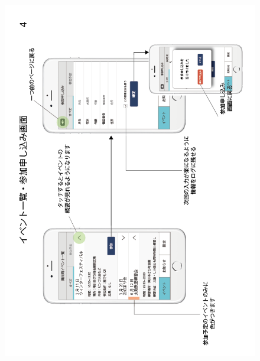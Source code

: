 \begin{figure}[ht]
    \begin{center}
    \includegraphics[keepaspectratio, scale=0.7]{appendixs/appendixB_figres/fig4.png}
    \end{center}
\end{figure}

